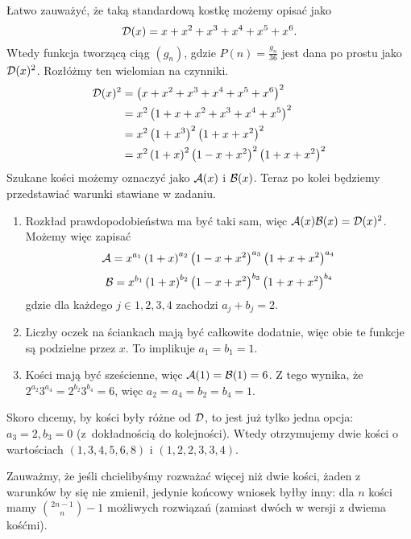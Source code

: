 \documentclass{scrartcl}
\begin{document}
    \begin{solution}
        Łatwo zauważyć, że taką standardową kostkę możemy opisać jako
        $$ \mathcal D(x) = x + x^2 + x^3 + x^4 + x^5 + x^6. $$
        Wtedy funkcja tworzącą ciąg $(g_n)$, gdzie $P(n) = \frac{g_n}{36}$ jest dana po prostu jako $\mathcal D(x)^2$. Rozłóżmy ten wielomian na czynniki.
        \begin{align*}
            \mathcal D(x)^2 &= \left(x + x^2 + x^3 + x^4 + x^5 + x^6\right)^2 \\
                    &= x^2\left(1 + x + x^2 + x^3 + x^4 + x^5\right)^2 \\
                    &= x^2\left(1 + x^3\right)^2\left(1 + x + x^2\right)^2 \\
                    &= x^2\left(1 + x\right)^2\left(1 - x + x^2\right)^2\left(1 + x + x^2\right)^2
        \end{align*}
        Szukane kości możemy oznaczyć jako $\mathcal A(x)$ i $\mathcal B(x)$. Teraz po kolei będziemy przedstawiać warunki stawiane w zadaniu.
        \begin{enumerate}
            \item Rozkład prawdopodobieństwa ma być taki sam, więc $\mathcal A(x)\mathcal B(x) = \mathcal D(x)^2$. Możemy więc zapisać
            $$ \mathcal A = x^{a_1}\left(1 + x\right)^{a_2}\left(1 - x + x^2\right)^{a_3}\left(1 + x + x^2\right)^{a_4} $$
            $$ \mathcal B = x^{b_1}\left(1 + x\right)^{b_2}\left(1 - x + x^2\right)^{b_3}\left(1 + x + x^2\right)^{b_4} $$
            gdzie dla każdego $j\in{1,2,3,4}$ zachodzi $a_j + b_j = 2$.
            \item Liczby oczek na ściankach mają być całkowite dodatnie, więc obie te funkcje są podzielne przez $x$. To implikuje $a_1 = b_1 = 1$.
            \item Kości mają być sześcienne, więc $\mathcal A(1) = \mathcal B(1) = 6$. Z tego wynika, że $2^{a_2}3^{a_4} = 2^{b_2}3^{b_4} = 6$, więc $a_2 = a_4 = b_2 = b_4 = 1$.
        \end{enumerate}
        Skoro chcemy, by kości były różne od $\mathcal D$, to jest już tylko jedna opcja: $a_3 = 2, b_3 = 0$ (z~dokładnością do kolejności). Wtedy otrzymujemy dwie kości o wartościach $(1, 3, 4, 5, 6, 8)$ i $(1, 2, 2, 3, 3, 4)$.
    \end{solution}

    Zauważmy, że jeśli chcielibyśmy rozważać więcej niż dwie kości, żaden z warunków by się nie zmienił, jedynie końcowy wniosek byłby inny: dla $n$ kości mamy $\binom{2n - 1}{n} - 1$ możliwych rozwiązań (zamiast dwóch w wersji z dwiema kośćmi).
\end{document}
